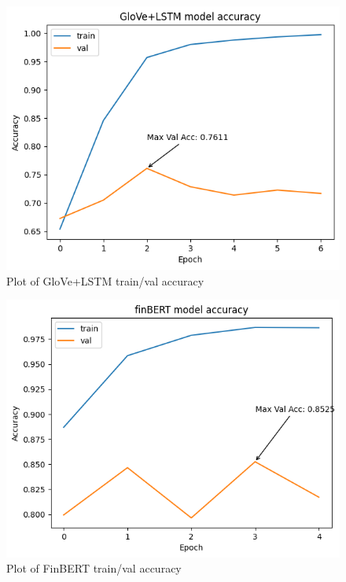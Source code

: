 \begin{figure}[!ht]
    \centering
    \includegraphics[width=11.5cm]{./images/plot_lstm.png}
    \caption{Plot of GloVe+LSTM train/val accuracy}
\end{figure}

\begin{figure}[!ht]
    \centering
    \includegraphics[width=12cm]{./images/plot_finBERT.png}
    \caption{Plot of FinBERT train/val accuracy}
\end{figure}

